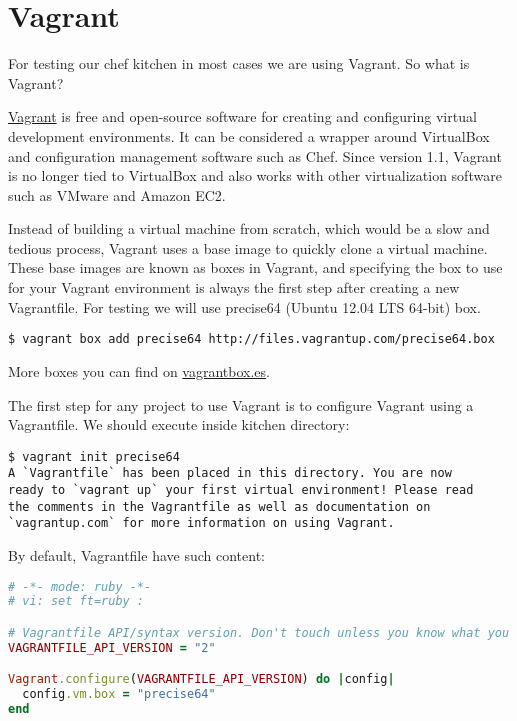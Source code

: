 \section{Vagrant}\label{sec:solo-vagrant}

For testing our chef kitchen in most cases we are using Vagrant. So what is Vagrant?

\href{http://www.vagrantup.com/}{Vagrant} is free and open-source software for creating and configuring virtual development environments. It can be considered a wrapper around VirtualBox and configuration management software such as Chef. Since version 1.1, Vagrant is no longer tied to VirtualBox and also works with other virtualization software such as VMware and Amazon EC2.

Instead of building a virtual machine from scratch, which would be a slow and tedious process, Vagrant uses a base image to quickly clone a virtual machine. These base images are known as boxes in Vagrant, and specifying the box to use for your Vagrant environment is always the first step after creating a new Vagrantfile. For testing we will use precise64 (Ubuntu 12.04 LTS 64-bit) box.

\begin{lstlisting}[label=lst:my-cloud-vagrant1]
$ vagrant box add precise64 http://files.vagrantup.com/precise64.box
\end{lstlisting}

More boxes you can find on \href{http://www.vagrantbox.es/}{vagrantbox.es}.

The first step for any project to use Vagrant is to configure Vagrant using a Vagrantfile. We should execute  inside kitchen directory:

\begin{lstlisting}[label=lst:my-cloud-vagrant2]
$ vagrant init precise64
A `Vagrantfile` has been placed in this directory. You are now
ready to `vagrant up` your first virtual environment! Please read
the comments in the Vagrantfile as well as documentation on
`vagrantup.com` for more information on using Vagrant.
\end{lstlisting}

By default, Vagrantfile have such content:

\begin{lstlisting}[language=Ruby,label=lst:my-cloud-vagrant3,title=my-cloud/nodes/Vagrantfile]
# -*- mode: ruby -*-
# vi: set ft=ruby :

# Vagrantfile API/syntax version. Don't touch unless you know what you're doing!
VAGRANTFILE_API_VERSION = "2"

Vagrant.configure(VAGRANTFILE_API_VERSION) do |config|
  config.vm.box = "precise64"
end
\end{lstlisting}

